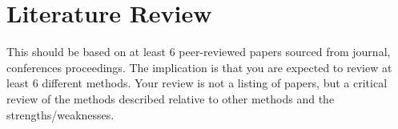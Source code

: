 \section{Literature Review}
\label{sec:literature}

\textbf{}
This should be based on at least 6 peer-reviewed papers sourced from journal, conferences proceedings.
The implication is that you are expected to review at least 6 different methods.
Your review is not a listing of papers, but a critical review of the methods described relative to other methods and the strengths/weaknesses.

\mylipsum

\mylipsum

\mylipsum

\mylipsum

\mylipsum

\mylipsum
